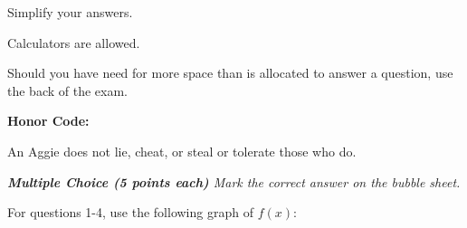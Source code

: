 \documentclass[11pt]{article}
\begin{document}
\Head
\begin{instructions}
\item Simplify your answers.
\item Calculators are allowed.
\item Should you have need for more space than is allocated to answer a question, use the back of the exam.
\item \textbf{Honor Code:}

\vspace{0.1in}
An Aggie does not lie, cheat, or steal or tolerate those who do.
\vspace{0.3in}

\par\noindent\makebox[2.5in]{\hrulefill} 
\par\noindent{}     
\end{instructions}
\newpage

\vspace{.2in}

\noindent \emph{{\bf Multiple Choice (5 points each)} Mark the correct
answer on the bubble sheet.}


For questions 1-4, use the following graph of $f(x)$:\\
\end{document}
